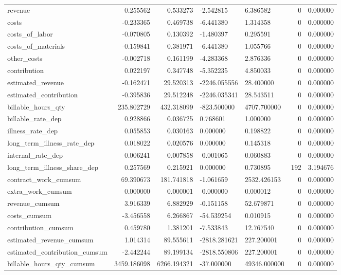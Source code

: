 \begin{landscape}
\begin{longtable}[h!]{lrrllrr}
revenue & 0.255562 & 0.533273 & -2.542815 & 6.386582 & 0 & 0.000000 \\
costs & -0.233365 & 0.469738 & -6.441380 & 1.314358 & 0 & 0.000000 \\
costs_of_labor & -0.070805 & 0.130392 & -1.480397 & 0.295591 & 0 & 0.000000 \\
costs_of_materials & -0.159841 & 0.381971 & -6.441380 & 1.055766 & 0 & 0.000000 \\
other_costs & -0.002718 & 0.161199 & -4.283368 & 2.876336 & 0 & 0.000000 \\
contribution & 0.022197 & 0.347748 & -5.352235 & 4.850033 & 0 & 0.000000 \\
estimated_revenue & -0.162471 & 29.520313 & -2246.055556 & 28.400000 & 0 & 0.000000 \\
estimated_contribution & -0.395836 & 29.512248 & -2246.035341 & 28.543511 & 0 & 0.000000 \\
billable_hours_qty & 235.802729 & 432.318099 & -823.500000 & 4707.700000 & 0 & 0.000000 \\
billable_rate_dep & 0.928866 & 0.036725 & 0.768601 & 1.000000 & 0 & 0.000000 \\
illness_rate_dep & 0.055853 & 0.030163 & 0.000000 & 0.198822 & 0 & 0.000000 \\
long_term_illness_rate_dep & 0.018022 & 0.020576 & 0.000000 & 0.145318 & 0 & 0.000000 \\
internal_rate_dep & 0.006241 & 0.007858 & -0.001065 & 0.060883 & 0 & 0.000000 \\
long_term_illness_share_dep & 0.257569 & 0.215921 & 0.000000 & 0.730895 & 192 & 3.194676 \\
contract_work_cumsum & 69.390673 & 181.741818 & -1.061659 & 2532.426153 & 0 & 0.000000 \\
extra_work_cumsum & 0.000000 & 0.000001 & -0.000000 & 0.000012 & 0 & 0.000000 \\
revenue_cumsum & 3.916339 & 6.882929 & -0.151158 & 52.679871 & 0 & 0.000000 \\
costs_cumsum & -3.456558 & 6.266867 & -54.539254 & 0.010915 & 0 & 0.000000 \\
contribution_cumsum & 0.459780 & 1.381201 & -7.533843 & 12.767540 & 0 & 0.000000 \\
estimated_revenue_cumsum & 1.014314 & 89.555611 & -2818.281621 & 227.200001 & 0 & 0.000000 \\
estimated_contribution_cumsum & -2.442244 & 89.199134 & -2818.550806 & 227.200001 & 0 & 0.000000 \\
billable_hours_qty_cumsum & 3459.186098 & 6266.194321 & -37.000000 & 49346.000000 & 0 & 0.000000 \\

\end{longtable}
\end{landscape}
